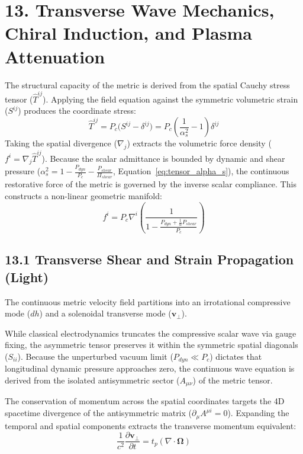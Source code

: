 \section*{13. Transverse Wave Mechanics, Chiral Induction, and Plasma Attenuation} 
The structural capacity of the metric is derived from the spatial Cauchy stress tensor ($\hat{T}^{ij}$). Applying the field equation against the symmetric volumetric strain ($S^{ij}$) produces the coordinate stress:
\begin{equation}
    \hat{T}^{ij} = P_c \Big( S^{ij} - \delta^{ij} \Big) = P_c \left( \frac{1}{\alpha_s^2} - 1 \right)\delta^{ij}
\end{equation}
Taking the spatial divergence ($\nabla_j$) extracts the volumetric force density ($f^i = \nabla_j \hat{T}^{ij}$). Because the scalar admittance is bounded by dynamic and shear pressure ($\alpha_s^2 = 1 - \frac{P_{dyn}}{P_c} - \frac{P_{shear}}{\Pi_{shear}}$, Equation~\ref{eq:tensor_alpha_s}), the continuous restorative force of the metric is governed by the inverse scalar compliance. This constructs a non-linear geometric manifold: %
\begin{equation}
    f^i = P_c \nabla^i \left( \frac{1}{1 - \frac{P_{dyn} + \frac{1}{\alpha}P_{shear}}{P_c}} \right) \label{eq:nonlinear_restorative_force} %
\end{equation}

\subsection*{13.1 Transverse Shear and Strain Propagation (Light)}
The continuous metric velocity field partitions into an irrotational compressive mode ($dh$) and a solenoidal transverse mode ($\mathbf{v}_\perp$). 

While classical electrodynamics truncates the compressive scalar wave via gauge fixing, the asymmetric tensor preserves it within the symmetric spatial diagonals ($S_{ii}$). 
Because the unperturbed vacuum limit ($P_{dyn} \ll P_c$) dictates that longitudinal dynamic pressure approaches zero, the continuous wave equation is derived from the isolated antisymmetric sector ($A_{\mu\nu}$) of the metric tensor. 

The conservation of momentum across the spatial coordinates targets the 4D spacetime divergence of the antisymmetric matrix ($\partial_\mu A^{\mu i} = 0$). Expanding the temporal and spatial components extracts the transverse momentum equivalent: 
\begin{equation}
    \frac{1}{c^2} \frac{\partial \mathbf{v}_\perp}{\partial t} = t_p (\nabla \cdot \boldsymbol{\Omega})
\end{equation}

